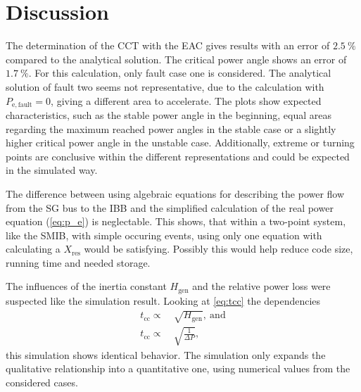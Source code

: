 \section{Discussion}
\label{sec:discussion}

The determination of the \acs{CCT} with the \acs{EAC} gives results with an error of $2.5~\%$ compared to the analytical solution. The critical power angle shows an error of $1.7~\%$. For this calculation, only fault case one is considered. The analytical solution of fault two seems not representative, due to the calculation with $P_\mathrm{e,fault}=0$, giving a different area to accelerate. The plots show expected characteristics, such as the stable power angle in the beginning, equal areas regarding the maximum reached power angles in the stable case or a slightly higher critical power angle in the unstable case. Additionally, extreme or turning points are conclusive within the different representations and could be expected in the simulated way.

The difference between using algebraic equations for describing the power flow from the \acs{SG} bus to the \acs{IBB} and the simplified calculation of the real power equation (\autoref{eq:p_e}) is neglectable. This shows, that within a two-point system, like the \acs{SMIB}, with simple occuring events, using only one equation with calculating a $X_\mathrm{res}$ would be satisfying. Possibly this would help reduce code size, running time and needed storage.

The influences of the inertia constant $H_\mathrm{gen}$ and the relative power loss were suspected like the simulation result. Looking at \autoref{eq:tcc} the dependencies
\begin{align}
        t_\mathrm{cc}\propto&~\sqrt{H_\mathrm{gen}} \nonumber,~\mathrm{and} \\[6pt]
        t_\mathrm{cc}\propto&~\sqrt{\frac{1}{\Delta P}} \nonumber,
\end{align}
this simulation shows identical behavior. The simulation only expands the qualitative relationship into a quantitative one, using numerical values from the considered cases.

